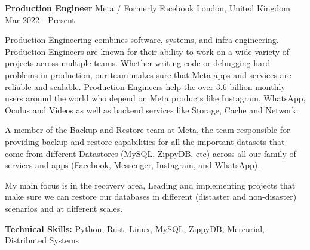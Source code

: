 

\begin{cventries}

  \cventry
    {\textbf{Production Engineer}} %
    {Meta / Formerly Facebook} %
    {London, United Kingdom} %
    {Mar 2022 - Present} %
    {
      \begin{cvitems} %
      \item {Production Engineering combines software, systems, and infra engineering. Production
        Engineers are known for their ability to work on a wide variety of projects across multiple
        teams.  Whether writing code or debugging hard problems in production, our team makes sure
        that Meta apps and services are reliable and scalable. Production Engineers help the over
        3.6 billion monthly users around the world who depend on Meta products like Instagram,
        WhatsApp, Oculus and Videos as well as backend services like Storage, Cache and Network.}
      \item {A member of the Backup and Restore team at Meta, the team responsible for providing
        backup and restore capabilities for all the important datasets that come from different
        Datastores (MySQL, ZippyDB, etc) across all our family of services and apps (Facebook,
        Messenger, Instagram, and WhatsApp).}
      \item {My main focus is in the recovery area, Leading and implementing projects that make sure
        we can restore our databases in different (distaster and non-disaster) scenarios and at
        different scales.}
      \item {\textbf{Technical Skills:} Python, Rust, Linux, MySQL, ZippyDB, Mercurial, Distributed
        Systems}
      \end{cvitems}
    }


\end{cventries}
